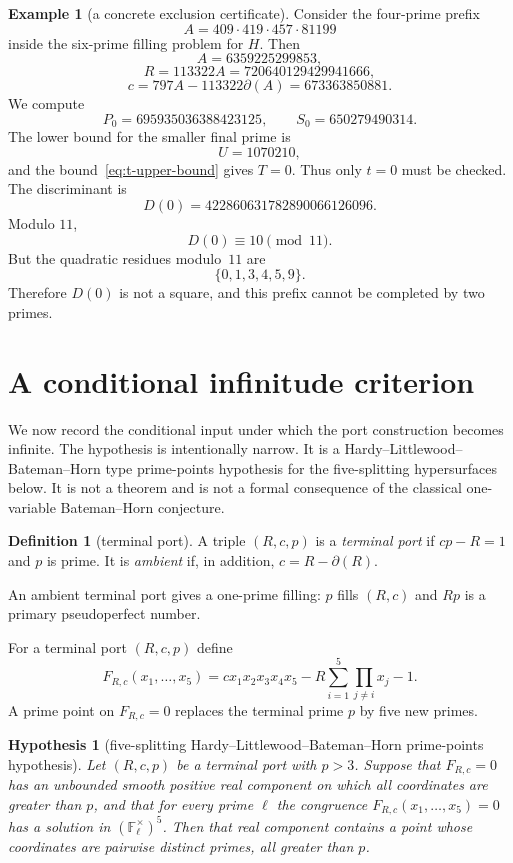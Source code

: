\documentclass[11pt]{amsart}
\theoremstyle{plain}
\newtheorem{hypothesis}[theorem]{Hypothesis}
\theoremstyle{definition}
\newtheorem{definition}[theorem]{Definition}
\newtheorem{example}[theorem]{Example}
\theoremstyle{remark}
\newcommand{\dd}{\partial}
\begin{document}
\begin{example}[a concrete exclusion certificate]\label{ex:certificate}
Consider the four-prime prefix
\[
        A=409\cdot419\cdot457\cdot81199
\]
inside the six-prime filling problem for $H$.  Then
\[
        A=6359225299853,
\]
\[
        R=113322A=720640129429941666,
\]
\[
        c=797A-113322\dd(A)=673363850881.
\]
We compute
\[
        P_0=695935036388423125,
        \qquad
        S_0=650279490314.
\]
The lower bound for the smaller final prime is
\[
        U=1070210,
\]
and the bound~\eqref{eq:t-upper-bound} gives $T=0$.  Thus only $t=0$ must be checked.  The discriminant is
\[
        D(0)=422860631782890066126096.
\]
Modulo $11$,
\[
        D(0)\equiv10\pmod{11}.
\]
But the quadratic residues modulo~$11$ are
\[
        \{0,1,3,4,5,9\}.
\]
Therefore $D(0)$ is not a square, and this prefix cannot be completed by two primes.
\end{example}



\section{A conditional infinitude criterion}\label{sec:conditional-infinitude}

We now record the conditional input under which the port construction becomes infinite.  The hypothesis is intentionally narrow.  It is a Hardy--Littlewood--Bateman--Horn type prime-points hypothesis for the five-splitting hypersurfaces below.  It is not a theorem and is not a formal consequence of the classical one-variable Bateman--Horn conjecture.

\begin{definition}[terminal port]
A triple $(R,c,p)$ is a \emph{terminal port} if $cp-R=1$ and $p$ is prime.  It is \emph{ambient} if, in addition, $c=R-\dd(R)$.
\end{definition}

An ambient terminal port gives a one-prime filling: $p$ fills $(R,c)$ and $Rp$ is a primary pseudoperfect number.

For a terminal port $(R,c,p)$ define
\begin{equation}\label{eq:five-split-hypersurface}
        F_{R,c}(x_1,\ldots,x_5)
        =c x_1x_2x_3x_4x_5
        -R\sum_{i=1}^5\prod_{j\ne i}x_j
        -1.
\end{equation}
A prime point on $F_{R,c}=0$ replaces the terminal prime $p$ by five new primes.

\begin{hypothesis}[five-splitting Hardy--Littlewood--Bateman--Horn prime-points hypothesis]\label{hyp:HLPP5}
Let $(R,c,p)$ be a terminal port with $p>3$.  Suppose that $F_{R,c}=0$ has an unbounded smooth positive real component on which all coordinates are greater than $p$, and that for every prime $\ell$ the congruence $F_{R,c}(x_1,\ldots,x_5)=0$ has a solution in $(\mathbb F_\ell^\times)^5$.  Then that real component contains a point whose coordinates are pairwise distinct primes, all greater than $p$.
\end{hypothesis}
\end{document}
